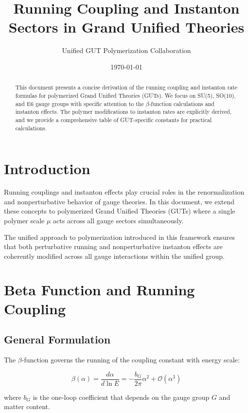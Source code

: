 \documentclass[11pt]{article}
\title{Running Coupling and Instanton Sectors in Grand Unified Theories}
\author{Unified GUT Polymerization Collaboration}
\date{\today}
\begin{document}
\maketitle

\begin{abstract}
This document presents a concise derivation of the running coupling and instanton rate formulas for polymerized Grand Unified Theories (GUTs). We focus on SU(5), SO(10), and E6 gauge groups with specific attention to the $\beta$-function calculations and instanton effects. The polymer modifications to instanton rates are explicitly derived, and we provide a comprehensive table of GUT-specific constants for practical calculations.
\end{abstract}

\section{Introduction}

Running couplings and instanton effects play crucial roles in the renormalization and nonperturbative behavior of gauge theories. In this document, we extend these concepts to polymerized Grand Unified Theories (GUTs) where a single polymer scale $\mu$ acts across all gauge sectors simultaneously. 

The unified approach to polymerization introduced in this framework ensures that both perturbative running and nonperturbative instanton effects are coherently modified across all gauge interactions within the unified group.

\section{Beta Function and Running Coupling}

\subsection{General Formulation}

The $\beta$-function governs the running of the coupling constant with energy scale:

\begin{equation}
\beta(\alpha) = \frac{d\alpha}{d\ln E} = -\frac{b_G}{2\pi}\alpha^2 + \mathcal{O}(\alpha^3)
\end{equation}

where $b_G$ is the one-loop coefficient that depends on the gauge group $G$ and matter content.
\end{document}
